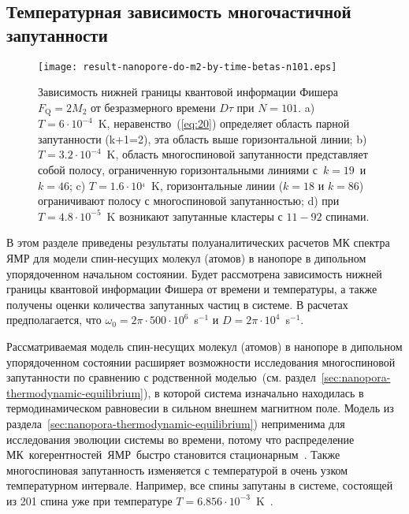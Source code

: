 \subsection{Температурная зависимость многочастичной запутанности}
\label{sec:5}

\begin{figure}[H]
 	\texttt{[image: result-nanopore-do-m2-by-time-betas-n101.eps]}
	\caption{
	  Зависимость нижней границы  квантовой информации Фишера $F_\mathrm{Q} = 2 M_{2}$
	  от безразмерного времени $D\tau$ при $N=101$.
	  a) $T=6\cdot10^{-4}$~K, неравенство~(\ref{eq:20}) определяет область парной запутанности  (k+1=2), эта область выше горизонтальной линии;
	  b) $T=3.2\cdot10^{-4}$~K, область многоспиновой запутанности представляет собой полосу, ограниченную горизонтальными линиями с~$k=19$~и~$k=46$;
	  c) $T = 1.6\cdot10^{_4}$~K, горизонтальные линии ($k=18$ и $k=86$) ограничивают полосу с многоспиновой запутанностью;
	  d) при $T=4.8\cdot10^{-5}$~K возникают запутанные кластеры с $11-92$ спинами.
	}
	\label{fig:result-nanopore-do-m2-by-time-betas-n101}
\end{figure}

В этом разделе приведены результаты полуаналитических расчетов МК спектра ЯМР
для модели спин-несущих молекул (атомов) в нанопоре в дипольном упорядоченном начальном состоянии.
Будет рассмотрена зависимость нижней границы квантовой информации Фишера от времени и температуры,
а также получены оценки количества запутанных частиц в системе.
В расчетах предполагается, что $\omega_{0} = 2\pi \cdot 500 \cdot 10^{6}$~s$^{-1}$ и $D = 2\pi \cdot 10^{4}$~s$^{-1}$.

Рассматриваемая модель спин-несущих молекул (атомов) в нанопоре в дипольном упорядоченном состоянии
расширяет возможности исследования многоспиновой запутанности по сравнению с родственной моделью~(см. раздел~\ref{sec:nanopora-thermodynamic-equilibrium}),
в которой система изначально находилась в термодинамическом равновесии в сильном внешнем магнитном поле.
Модель из раздела~\ref{sec:nanopora-thermodynamic-equilibrium}) неприменима для исследования эволюции системы во времени,
потому что распределение МК~когерентностей~ЯМР~быстро становится стационарным~\cite{Doronin2009}.
Также многоспиновая запутанность изменяется с температурой в очень узком температурном интервале.
Например, все спины запутаны в системе, состоящей из 201 спина уже при температуре $T=6.856\cdot10^{-3}$~K~\cite{Doronin2019}.


